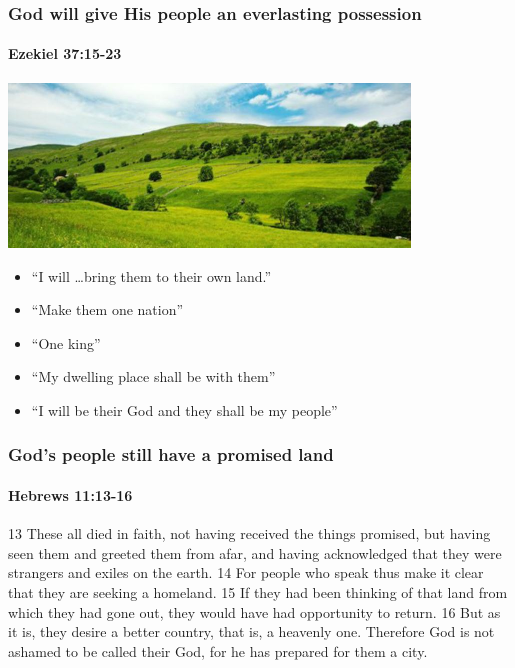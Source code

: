 \begin{frame}
\frametitle{God will give His people an everlasting possession}
\framesubtitle{Ezekiel 37:15-23}
\begin{center}
\includegraphics[width=0.8\textwidth]{figures/land.jpg}
\end{center}
\begin{itemize}
\item ``I will \ldots bring them to their own land.''
\item ``Make them one nation''
\item ``One king''
\item ``My dwelling place shall be with them''
\item ``I will be their God and they shall be my people''
\end{itemize}

\end{frame}

\begin{frame}
\frametitle{God's people still have a promised land}
\framesubtitle{Hebrews 11:13-16}
13 These all died in faith, not having received the things promised, but having seen them and greeted them from afar, and having acknowledged that they were strangers and exiles on the earth. 14 For people who speak thus make it clear that they are seeking a homeland. 15 If they had been thinking of that land from which they had gone out, they would have had opportunity to return. 16 But as it is, they desire a better country, that is, a heavenly one. Therefore God is not ashamed to be called their God, for he has prepared for them a city.

\end{frame}

